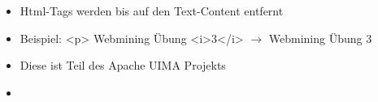 \begin{frame}[c]
\begin{itemize}
  \begin{itemize}
  \item Html-Tags werden bis auf den Text-Content entfernt
  \item Beispiel: <p> Webmining Übung <i>3</i> $\rightarrow$ Webmining Übung 3 
\end{itemize}
  \begin{itemize}
  \item Diese ist Teil des Apache UIMA Projekts
  \item \end{itemize}
\end{itemize}
\end{frame}